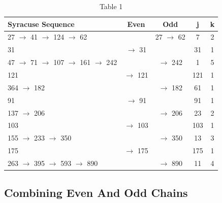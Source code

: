 \documentclass[preprint]{sigplanconf}
\begin{document}
\begin{table}
    \begin{center}
        \begin{tabular}{|l|c|c|c|c|}
            \hline
            \textbf{Syracuse Sequence}                & \textbf{Even} & \textbf{Odd} & \textbf{j} & \textbf{k} \\
            \hline
            27 $\to$ 41 $\to$ 124 $\to$ 62            &               & 27 $\to$ 62  & 7          & 2          \\
            \hline
            31                                        & $\to$ 31      &              & 31         & 1          \\
            \hline
            47 $\to$ 71 $\to$ 107 $\to$ 161 $\to$ 242 &               & $\to$ 242    & 1          & 5          \\
            \hline
            121                                       & $\to$ 121     &              & 121        & 1          \\
            \hline
            364 $\to$ 182                             &               & $\to$ 182    & 61         & 1          \\
            \hline
            91                                        & $\to$ 91      &              & 91         & 1          \\
            \hline
            137 $\to$ 206                             &               & $\to$ 206    & 23         & 2          \\
            \hline
            103                                       & $\to$ 103     &              & 103        & 1          \\
            \hline
            155 $\to$ 233 $\to$ 350                   &               & $\to$ 350    & 13         & 3          \\
            \hline
            175                                       & $\to$ 175     &              & 175        & 1          \\
            \hline
            263 $\to$ 395 $\to$ 593 $\to$ 890         &               & $\to$ 890    & 11         & 4          \\
            \hline
        \end{tabular}
        \caption{Table 1}
        \label{tab-1}
    \end{center}
\end{table}

\subsection{Combining Even And Odd Chains}
\end{document}
